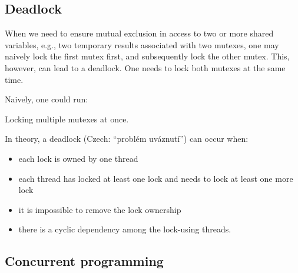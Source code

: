 \subsection{Deadlock}

When we need to ensure mutual exclusion in access to two or more shared variables, 
e.g., two temporary results associated with two mutexes, 
one may naively lock the first mutex first, and subsequently lock the other mutex. This, however, 
can lead to a deadlock. One needs to lock both mutexes at the same time.  

Naively, one could run:

\raggedbottom
\begin{codebox}[]{\href{https://godbolt.org/z/s7Yj9M5vf}{\ExternalLink}}
\footnotesize Locking multiple mutexes at once.
\tcblower
{}
\end{codebox}

In theory, a deadlock (Czech: ``problém uváznutí'') can occur when:
\begin{itemize}
\item each lock is owned by one thread
\item each thread has locked at least one lock and needs to lock at least one more lock
\item it is impossible to remove the lock ownership
\item there is a cyclic dependency among the lock-using threads.
\end{itemize}

\subsection{Concurrent programming}

